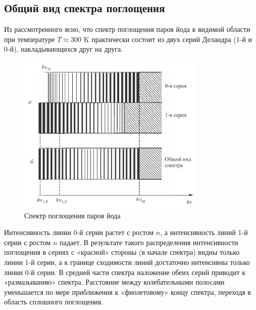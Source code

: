 \documentclass[a4paper,12pt]{article}
\begin{document}
\subsection{Общий вид спектра поглощения}
Из рассмотренного ясно, что спектр поглощения паров йода в видимой области при температуре $T \approx 300$ K практически состоит из двух серий Деландра (1-й и 0-й), накладывающихся друг на друга.
\begin{figure}[H]\label{fig: Iodine spectrum lines 0 1}
    \centering
    \includegraphics[width = 0.8\textwidth]{Iodine spectrum lines 0 1.png}
    \caption{Спектр поглощения паров йода}
\end{figure}

Интенсивность линии 0-й серии растет с ростом $n$, а интенсивность линий 1-й серии с ростом $n$ падает. В результате
такого распределения интенсивности поглощения в сериях с «красной» стороны (в начале спектра) видны только линии 1-й серии, а к границе сходимости линий достаточно интенсивны только линии 0-й серии. В средней части спектра наложение обеих серий приводит к «размазыванию» спектра. Расстояние между колебательными полосами уменьшается по мере приближения к «фиолетовому» концу спектра, переходя в область сплошного поглощения.
\end{document}

